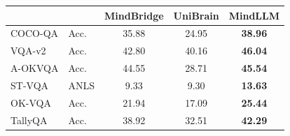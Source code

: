 \documentclass[border=6pt]{standalone}
\begin{document}
\fontsize{18}{22}\selectfont
\setlength{\tabcolsep}{9pt}
\renewcommand{\arraystretch}{1.25}
\begin{tabular}{llSS S}
\toprule
& & {\textcolor{hdr}{MindBridge}} & {\textcolor{hdr}{UniBrain}} & {\textcolor{hdr}{\bfseries MindLLM}} \\
\midrule
COCO-QA  & Acc. & 35.88 & 24.95 & \bfseries 38.96 \\
VQA-v2   & Acc. & 42.80 & 40.16 & \bfseries 46.04 \\
A-OKVQA  & Acc. & 44.55 & 28.71 & \bfseries 45.54 \\
ST-VQA   & ANLS     &  9.33 &  9.30 & \bfseries 13.63 \\
OK-VQA   & Acc. & 21.94 & 17.09 & \bfseries 25.44 \\
TallyQA  & Acc. & 38.92 & 32.51 & \bfseries 42.29 \\
\bottomrule
\end{tabular}
\end{document}
